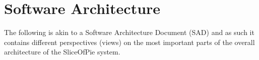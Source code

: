 \section{Software Architecture}

The following is akin to a Software Architecture Document (SAD) \cite[p.~655-659]{Larman2011} and as such
it contains different perspectives (views) on the most important parts of the overall architecture
of the SliceOfPie system.

















